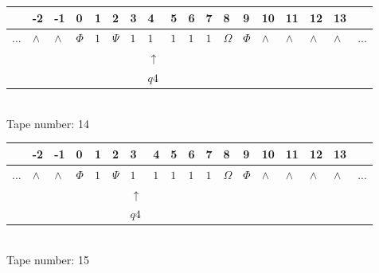 \documentclass[11pt]{article}
\begin{document}
\begin{table}[H]
\centering
\begin{tabular}{llllllllllllllllll}
 & -2 & -1 & 0 & 1 & 2 & 3 & 4 & 5 & 6 & 7 & 8 & 9 & 10 & 11 & 12 & 13 & \\
\hline
$...$ & \multicolumn{1}{|l|}{$\wedge$} & \multicolumn{1}{|l|}{$\wedge$} & \multicolumn{1}{|l|}{$\Phi$} & \multicolumn{1}{|l|}{$1$} & \multicolumn{1}{|l|}{$\Psi$} & \multicolumn{1}{|l|}{$1$} & \multicolumn{1}{|l|}{$1$} & \multicolumn{1}{|l|}{$1$} & \multicolumn{1}{|l|}{$1$} & \multicolumn{1}{|l|}{$1$} & \multicolumn{1}{|l|}{$\Omega$} & \multicolumn{1}{|l|}{$\Phi$} & \multicolumn{1}{|l|}{$\wedge$} & \multicolumn{1}{|l|}{$\wedge$} & \multicolumn{1}{|l|}{$\wedge$} & \multicolumn{1}{|l|}{$\wedge$} & $...$\\
\hline
&  &  &  &  &  &  & $\uparrow$ &  &  &  &  &  &  &  &  &  &  \\
&  &  &  &  &  &  & $ q4 $ &  &  &  &  &  &  &  &  &  &  \\
\end{tabular}
\\
Tape number: 14
\noindent\makebox[\linewidth]{\hdashrule{\textwidth}{1pt}{1pt}}\end{table}

\begin{table}[H]
\centering
\begin{tabular}{llllllllllllllllll}
 & -2 & -1 & 0 & 1 & 2 & 3 & 4 & 5 & 6 & 7 & 8 & 9 & 10 & 11 & 12 & 13 & \\
\hline
$...$ & \multicolumn{1}{|l|}{$\wedge$} & \multicolumn{1}{|l|}{$\wedge$} & \multicolumn{1}{|l|}{$\Phi$} & \multicolumn{1}{|l|}{$1$} & \multicolumn{1}{|l|}{$\Psi$} & \multicolumn{1}{|l|}{$1$} & \multicolumn{1}{|l|}{$1$} & \multicolumn{1}{|l|}{$1$} & \multicolumn{1}{|l|}{$1$} & \multicolumn{1}{|l|}{$1$} & \multicolumn{1}{|l|}{$\Omega$} & \multicolumn{1}{|l|}{$\Phi$} & \multicolumn{1}{|l|}{$\wedge$} & \multicolumn{1}{|l|}{$\wedge$} & \multicolumn{1}{|l|}{$\wedge$} & \multicolumn{1}{|l|}{$\wedge$} & $...$\\
\hline
&  &  &  &  &  & $\uparrow$ &  &  &  &  &  &  &  &  &  &  &  \\
&  &  &  &  &  & $ q4 $ &  &  &  &  &  &  &  &  &  &  &  \\
\end{tabular}
\\
Tape number: 15
\noindent\makebox[\linewidth]{\hdashrule{\textwidth}{1pt}{1pt}}\end{table}
\end{document}
